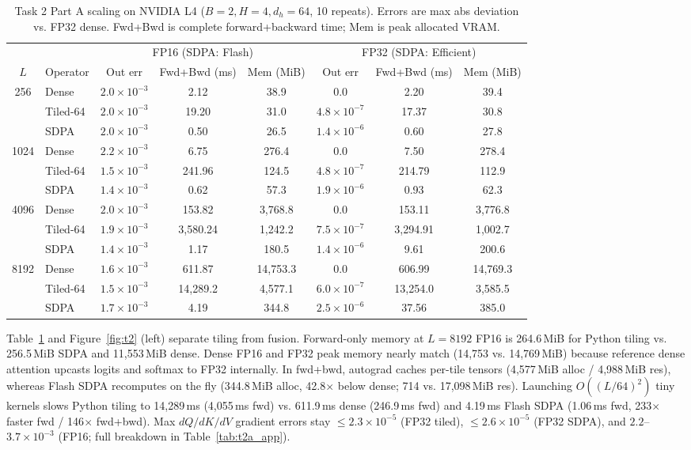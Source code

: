 \documentclass{article}
\begin{document}
\begin{table}[t]
\centering\footnotesize
\caption{Task 2 Part A scaling on NVIDIA L4 ($B=2, H=4, d_h=64$, 10 repeats). Errors are max abs deviation vs. FP32 dense. Fwd+Bwd is complete forward+backward time; Mem is peak allocated VRAM.}
\label{tab:t2a}
\begin{tabular}{clcccccc}
\toprule
 & & \multicolumn{3}{c}{FP16 (SDPA: Flash)} & \multicolumn{3}{c}{FP32 (SDPA: Efficient)} \\
\cmidrule(lr){3-5}\cmidrule(lr){6-8}
$L$ & Operator & Out err & Fwd+Bwd (ms) & Mem (MiB) & Out err & Fwd+Bwd (ms) & Mem (MiB) \\
\midrule
256 & Dense & $2.0{\times}10^{-3}$ & 2.12 & 38.9 & 0.0 & 2.20 & 39.4 \\
 & Tiled-64 & $2.0{\times}10^{-3}$ & 19.20 & 31.0 & $4.8{\times}10^{-7}$ & 17.37 & 30.8 \\
 & SDPA & $2.0{\times}10^{-3}$ & 0.50 & 26.5 & $1.4{\times}10^{-6}$ & 0.60 & 27.8 \\
\midrule
1024 & Dense & $2.2{\times}10^{-3}$ & 6.75 & 276.4 & 0.0 & 7.50 & 278.4 \\
 & Tiled-64 & $1.5{\times}10^{-3}$ & 241.96 & 124.5 & $4.8{\times}10^{-7}$ & 214.79 & 112.9 \\
 & SDPA & $1.4{\times}10^{-3}$ & 0.62 & 57.3 & $1.9{\times}10^{-6}$ & 0.93 & 62.3 \\
\midrule
4096 & Dense & $2.0{\times}10^{-3}$ & 153.82 & 3,768.8 & 0.0 & 153.11 & 3,776.8 \\
 & Tiled-64 & $1.9{\times}10^{-3}$ & 3,580.24 & 1,242.2 & $7.5{\times}10^{-7}$ & 3,294.91 & 1,002.7 \\
 & SDPA & $1.4{\times}10^{-3}$ & 1.17 & 180.5 & $1.4{\times}10^{-6}$ & 9.61 & 200.6 \\
\midrule
8192 & Dense & $1.6{\times}10^{-3}$ & 611.87 & 14,753.3 & 0.0 & 606.99 & 14,769.3 \\
 & Tiled-64 & $1.5{\times}10^{-3}$ & 14,289.2 & 4,577.1 & $6.0{\times}10^{-7}$ & 13,254.0 & 3,585.5 \\
 & SDPA & $1.7{\times}10^{-3}$ & 4.19 & 344.8 & $2.5{\times}10^{-6}$ & 37.56 & 385.0 \\
\bottomrule
\end{tabular}
\end{table}

Table~\ref{tab:t2a} and Figure~\ref{fig:t2} (left) separate tiling from fusion. Forward-only memory at $L=8192$ FP16 is 264.6\,MiB for Python tiling vs. 256.5\,MiB SDPA and 11,553\,MiB dense. Dense FP16 and FP32 peak memory nearly match (14,753 vs. 14,769\,MiB) because reference dense attention upcasts logits and softmax to FP32 internally. In fwd+bwd, autograd caches per-tile tensors (4,577\,MiB alloc / 4,988\,MiB res), whereas Flash SDPA recomputes on the fly (344.8\,MiB alloc, 42.8$\times$ below dense; 714 vs. 17,098\,MiB res). Launching $O((L/64)^2)$ tiny kernels slows Python tiling to 14,289\,ms (4,055\,ms fwd) vs. 611.9\,ms dense (246.9\,ms fwd) and 4.19\,ms Flash SDPA (1.06\,ms fwd, 233$\times$ faster fwd / 146$\times$ fwd+bwd). Max $dQ/dK/dV$ gradient errors stay $\le 2.3\times 10^{-5}$ (FP32 tiled), $\le 2.6\times 10^{-5}$ (FP32 SDPA), and $2.2$--$3.7\times 10^{-3}$ (FP16; full breakdown in Table~\ref{tab:t2a_app}).
\end{document}
